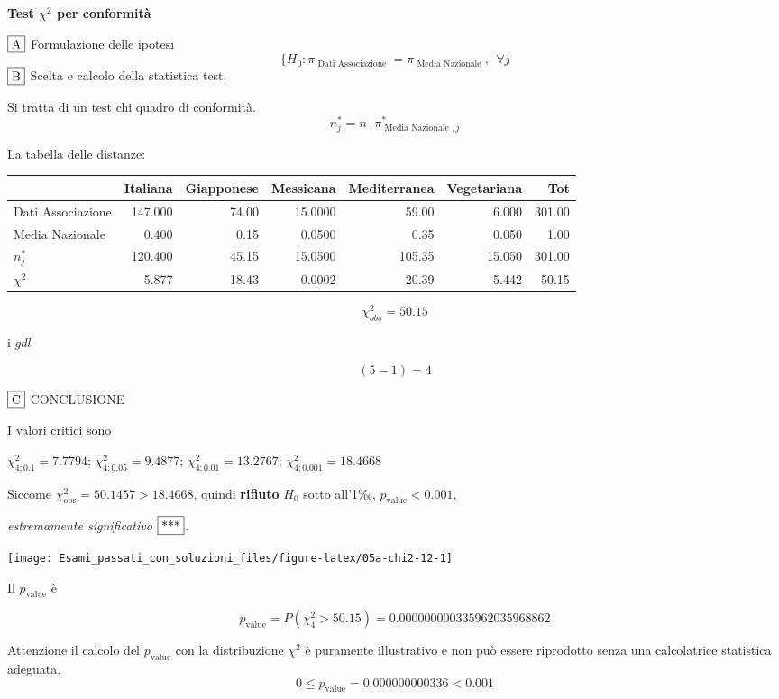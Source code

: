 \documentclass[
  11pt,
]{book}
\theoremstyle{mytheoremstyle}
\theoremstyle{mydefstyle}
\newenvironment{sol}
  {
  \begin{tcolorbox}[enhanced,breakable,arc=0.1mm,boxrule=1pt,colback=white,colframe=iblue,
  title=\bf \fontfamily{lmss}\selectfont \hspace{.5 cm} Soluzione,drop fuzzy shadow]

}{
\end{tcolorbox}
  }
\begin{document}
\begin{sol}
\textbf{Test \(\chi^2\) per conformità}

\(\fbox{A}\) Formulazione delle ipotesi
\[
\{H_0:\pi_\text{ Dati Associazione }= \pi_\text{ Media Nazionale },~~\forall j
\]
\(\fbox{B}\) Scelta e calcolo della statistica test.

Si tratta di un test chi quadro di conformità.
\[
n^*_j = n\cdot \pi^*_{\text{ Media Nazionale },j} 
\]

La tabella delle distanze:

\begin{table}[H]
\centering
\begin{tabular}{lrrrrrr}
\toprule
  & Italiana & Giapponese & Messicana & Mediterranea & Vegetariana & Tot\\
\midrule
Dati Associazione & 147.000 & 74.00 & 15.0000 & 59.00 & 6.000 & 301.00\\
Media Nazionale & 0.400 & 0.15 & 0.0500 & 0.35 & 0.050 & 1.00\\
$n_j^*$ & 120.400 & 45.15 & 15.0500 & 105.35 & 15.050 & 301.00\\
$\chi^2$ & 5.877 & 18.43 & 0.0002 & 20.39 & 5.442 & 50.15\\
\bottomrule
\end{tabular}
\end{table}

\[
    \chi^2_{obs}= 50.15 
  \]

i \(gdl\)

\[
    ( 5 -1)= 4 
  \]

\(\fbox{C}\) CONCLUSIONE

I valori critici sono

\(\chi^2_{4;0.1}=7.7794\); \(\chi^2_{4;0.05}=9.4877\); \(\chi^2_{4;0.01}=13.2767\); \(\chi^2_{4;0.001}=18.4668\)

Siccome \(\chi^2_\text{obs}=50.1457>18.4668\), quindi \textbf{rifiuto} \(H_0\) sotto all'1‰, \(p_\text{value}<0.001\),

\emph{estremamente significativo} \(\fbox{***}\).

\begin{center}\texttt{[image: Esami\_passati\_con\_soluzioni\_files/figure-latex/05a-chi2-12-1]} \end{center}

Il \(p_{\text{value}}\) è

\[ p_{\text{value}} = P(\chi^2_{4}>50.15)=0.000000000335962035968862 \]

Attenzione il calcolo del \(p_\text{value}\) con la distribuzione \(\chi^2\) è puramente illustrativo e non può essere riprodotto senza una calcolatrice statistica adeguata.\[
 0 \leq p_\text{value}= 0.000000000336 < 0.001 
\]

\end{sol}
\end{document}
